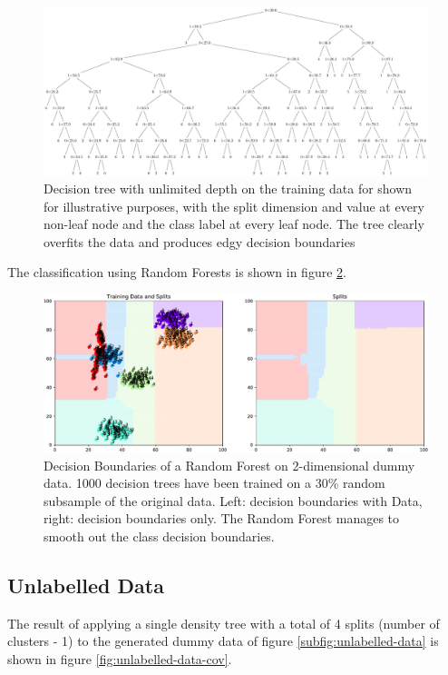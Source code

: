 \documentclass{article}
\begin{document}
\begin{figure}[H]
    \centering
    \includegraphics[width=\textwidth]{decision_tree.pdf}
    \caption{Decision tree with unlimited depth on the training data for shown for illustrative purposes, with the split dimension and value at every non-leaf node and the class label at every leaf node. The tree clearly overfits the data and produces edgy decision boundaries}
    \label{fig:decision_tree}
\end{figure}


The classification using Random Forests is shown in figure \ref{fig:rf}.

\begin{figure}[H]
    \centering
    \includegraphics[width=\textwidth]{rf}
    \caption{Decision Boundaries of a Random Forest on 2-dimensional dummy data. 1000 decision trees have been trained on a 30\% random subsample of the original data. Left: decision boundaries with Data, right: decision boundaries only. The Random Forest manages to smooth  out the class decision boundaries.}
    \label{fig:rf}
\end{figure}

\subsection{Unlabelled Data}
The result of applying a single density tree with a total of 4 splits (number of clusters - 1) to the generated dummy data of figure \ref{subfig:unlabelled-data} is shown in figure \ref{fig:unlabelled-data-cov}.
\end{document}
